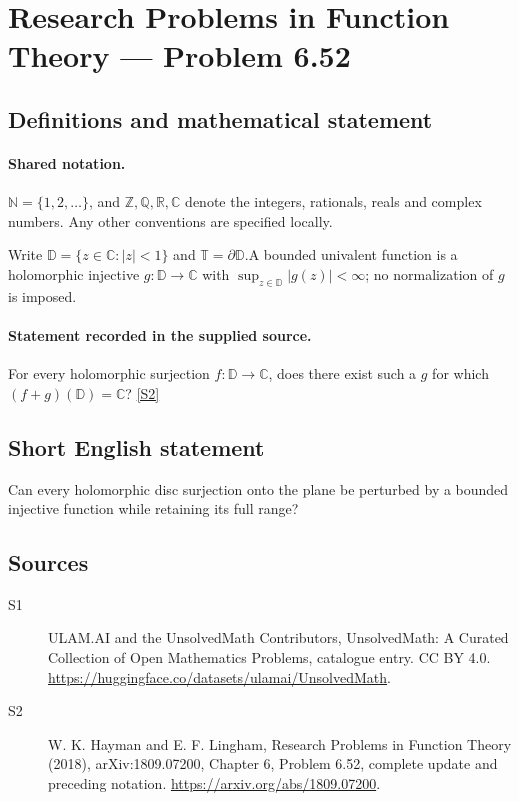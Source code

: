 \documentclass[11pt]{article}
\newcommand{\sref}[2]{\hyperlink{source:#1:#2}{[S#2]}}
\begin{document}
\section{Research Problems in Function Theory — Problem 6.52}\label{statement}

\subsection{Definitions and mathematical statement}

\paragraph{Shared notation.}$\mathbb N=\{1,2,\ldots\}$, and $\mathbb Z,\mathbb Q,\mathbb R,\mathbb C$ denote the integers, rationals, reals and complex numbers. Any other conventions are specified locally.


Write $\mathbb D=\{z\in\mathbb C:|z|<1\}$ and $\mathbb T=\partial\mathbb D$.A bounded univalent function is a holomorphic injective $g:\mathbb D\to\mathbb C$ with $\sup_{z\in\mathbb D}|g(z)|<\infty$; no normalization of $g$ is imposed.
\paragraph{Statement recorded in the supplied source.}
For every holomorphic surjection $f:\mathbb D\to\mathbb C$, does there exist such a $g$ for which $(f+g)(\mathbb D)=\mathbb C$? \sref{statement}{2}
\subsection{Short English statement}
Can every holomorphic disc surjection onto the plane be perturbed by a bounded injective function while retaining its full range?
\subsection{Sources}
\begin{description}
\item[\hypertarget{source:statement:1}{S1}] ULAM.AI and the UnsolvedMath Contributors, UnsolvedMath: A Curated Collection of Open Mathematics Problems, catalogue entry. CC BY 4.0. \url{https://huggingface.co/datasets/ulamai/UnsolvedMath}.
\item[\hypertarget{source:statement:2}{S2}] W. K. Hayman and E. F. Lingham, Research Problems in Function Theory (2018), arXiv:1809.07200, Chapter 6, Problem 6.52, complete update and preceding notation. \url{https://arxiv.org/abs/1809.07200}.
\end{description}
\label{end:statement}
\end{document}
